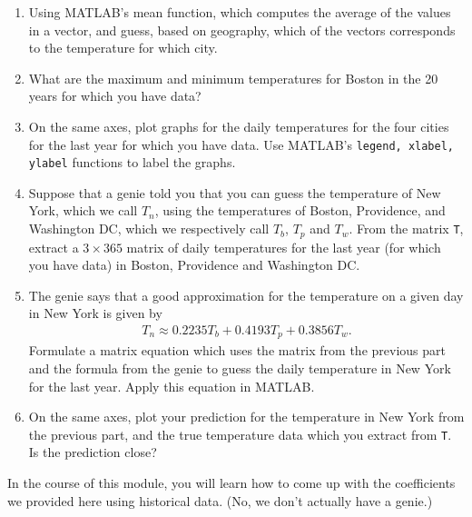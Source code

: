 \begin{prob}
\begin{enumerate}
\item Using MATLAB's mean function, which computes the average of the values in a vector, and guess, based on geography, which of the vectors corresponds to the temperature for which city.

\item What are the maximum and minimum temperatures for Boston in the 20 years for which you have data?

\item On the same axes, plot graphs for the daily temperatures for the four cities for the last year for which you have data. Use MATLAB's \texttt{legend, xlabel, ylabel} functions to label the graphs.

\item Suppose that a genie told you that you can guess the temperature of New York, which we call $T_n$, using the temperatures of Boston, Providence, and Washington DC, which we respectively call $T_b$, $T_p$ and $T_w$. From the matrix \texttt{T}, extract a $3 \times 365$ matrix of daily temperatures for the last year (for which you have data) in Boston, Providence and Washington DC.

\item The genie says that a good approximation for the temperature on a given day in New York is given by
    \begin{align}
    T_n \approx 0.2235 T_b + 0.4193 T_p + 0.3856 T_w.
    \end{align}
    Formulate a matrix equation which uses the matrix from the previous part and the formula from the genie to guess the daily temperature in New York for the last year. Apply this equation in MATLAB.
    
    \item On the same axes, plot your prediction for the temperature in New York from the previous part, and the true temperature data which you extract from \texttt{T}. Is the prediction close?
\end{enumerate}

In the course of this module, you will learn how to come up with the coefficients we provided here using historical data. (No, we don't actually have a genie.)
\end{prob}

